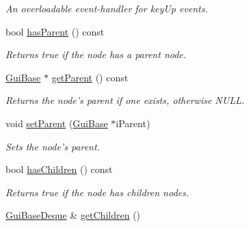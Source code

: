 \begin{DoxyCompactItemize}
\begin{DoxyCompactList}\small\item\em An overloadable event-\/handler for key\-Up events. \end{DoxyCompactList}\item 
\hypertarget{class_gui_base_aaf56570a4104f842b8b1fb533342b198}{bool \hyperlink{class_gui_base_aaf56570a4104f842b8b1fb533342b198}{has\-Parent} () const }\label{class_gui_base_aaf56570a4104f842b8b1fb533342b198}

\begin{DoxyCompactList}\small\item\em Returns true if the node has a parent node. \end{DoxyCompactList}\item 
\hypertarget{class_gui_base_a92e8c890aca536b6c542dae8b16a2b36}{\hyperlink{class_gui_base}{Gui\-Base} $\ast$ \hyperlink{class_gui_base_a92e8c890aca536b6c542dae8b16a2b36}{get\-Parent} () const }\label{class_gui_base_a92e8c890aca536b6c542dae8b16a2b36}

\begin{DoxyCompactList}\small\item\em Returns the node's parent if one exists, otherwise N\-U\-L\-L. \end{DoxyCompactList}\item 
\hypertarget{class_gui_base_a306709c52a6e4fb06ae58f4a9061d2e9}{void \hyperlink{class_gui_base_a306709c52a6e4fb06ae58f4a9061d2e9}{set\-Parent} (\hyperlink{class_gui_base}{Gui\-Base} $\ast$i\-Parent)}\label{class_gui_base_a306709c52a6e4fb06ae58f4a9061d2e9}

\begin{DoxyCompactList}\small\item\em Sets the node's parent. \end{DoxyCompactList}\item 
\hypertarget{class_gui_base_a774b4aac5d662980acca69de5c9ac024}{bool \hyperlink{class_gui_base_a774b4aac5d662980acca69de5c9ac024}{has\-Children} () const }\label{class_gui_base_a774b4aac5d662980acca69de5c9ac024}

\begin{DoxyCompactList}\small\item\em Returns true if the node has children nodes. \end{DoxyCompactList}\item 
\hypertarget{class_gui_base_a3b03dd2b4bc97f86d73b183e6367caf1}{\hyperlink{class_gui_base_a0f3e57c1a942210072030196844b22eb}{Gui\-Base\-Deque} \& \hyperlink{class_gui_base_a3b03dd2b4bc97f86d73b183e6367caf1}{get\-Children} ()}\label{class_gui_base_a3b03dd2b4bc97f86d73b183e6367caf1}


\end{DoxyCompactItemize}

